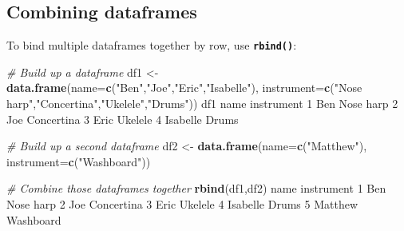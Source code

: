 \documentclass[]{book}
\newenvironment{Shaded}{\begin{snugshade}}{\end{snugshade}}
\newcommand{\CommentTok}[1]{\textcolor[rgb]{0.56,0.35,0.01}{\textit{#1}}}
\newcommand{\DataTypeTok}[1]{\textcolor[rgb]{0.13,0.29,0.53}{#1}}
\newcommand{\DecValTok}[1]{\textcolor[rgb]{0.00,0.00,0.81}{#1}}
\newcommand{\KeywordTok}[1]{\textcolor[rgb]{0.13,0.29,0.53}{\textbf{#1}}}
\newcommand{\NormalTok}[1]{#1}
\newcommand{\StringTok}[1]{\textcolor[rgb]{0.31,0.60,0.02}{#1}}
\begin{document}
\hypertarget{combining-dataframes}{%
\subsection*{Combining dataframes}\label{combining-dataframes}}

To bind multiple dataframes together by row, use \textbf{\texttt{rbind()}}:

\begin{Shaded}
\begin{Highlighting}[]
\CommentTok{# Build up a dataframe}
\NormalTok{df1 <-}\StringTok{ }\KeywordTok{data.frame}\NormalTok{(}\DataTypeTok{name=}\KeywordTok{c}\NormalTok{(}\StringTok{"Ben"}\NormalTok{,}\StringTok{"Joe"}\NormalTok{,}\StringTok{"Eric"}\NormalTok{,}\StringTok{"Isabelle"}\NormalTok{),}
                  \DataTypeTok{instrument=}\KeywordTok{c}\NormalTok{(}\StringTok{"Nose harp"}\NormalTok{,}\StringTok{"Concertina"}\NormalTok{,}\StringTok{"Ukelele"}\NormalTok{,}\StringTok{"Drums"}\NormalTok{))}
\NormalTok{df1}
\NormalTok{      name instrument}
\DecValTok{1}\NormalTok{      Ben  Nose harp}
\DecValTok{2}\NormalTok{      Joe Concertina}
\DecValTok{3}\NormalTok{     Eric    Ukelele}
\DecValTok{4}\NormalTok{ Isabelle      Drums}
\end{Highlighting}
\end{Shaded}

\begin{Shaded}
\begin{Highlighting}[]
\CommentTok{# Build up a second dataframe}
\NormalTok{df2 <-}\StringTok{ }\KeywordTok{data.frame}\NormalTok{(}\DataTypeTok{name=}\KeywordTok{c}\NormalTok{(}\StringTok{"Matthew"}\NormalTok{),}
                  \DataTypeTok{instrument=}\KeywordTok{c}\NormalTok{(}\StringTok{"Washboard"}\NormalTok{))}
\end{Highlighting}
\end{Shaded}

\begin{Shaded}
\begin{Highlighting}[]
\CommentTok{# Combine those dataframes together}
\KeywordTok{rbind}\NormalTok{(df1,df2)}
\NormalTok{      name instrument}
\DecValTok{1}\NormalTok{      Ben  Nose harp}
\DecValTok{2}\NormalTok{      Joe Concertina}
\DecValTok{3}\NormalTok{     Eric    Ukelele}
\DecValTok{4}\NormalTok{ Isabelle      Drums}
\DecValTok{5}\NormalTok{  Matthew  Washboard}
\end{Highlighting}
\end{Shaded}
\end{document}
